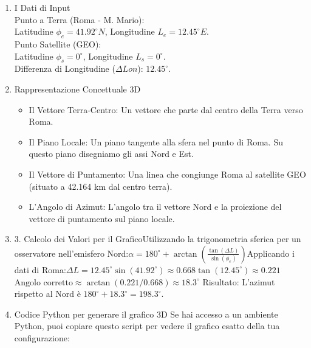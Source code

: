 \documentclass[a4paper,14pt]{article}
\begin{document}
\begin{enumerate}
\item I Dati di Input\\
Punto a Terra (Roma - M. Mario):\\
Latitudine \(\phi _{e}=41.92^{\circ }N\), Longitudine \(L_{e}=12.45^{\circ }E\).\\
Punto Satellite (GEO):\\
Latitudine \(\phi _{s}=0^{\circ }\), Longitudine \(L_{s}=0^{\circ }\).\\
Differenza di Longitudine (\(\Delta Lon\)): \(12.45^{\circ }\).\\
\item Rappresentazione Concettuale 3D\\
\begin{itemize}
\item Il Vettore Terra-Centro: Un vettore che parte dal centro della Terra verso Roma.
\item Il Piano Locale: Un piano tangente alla sfera nel punto di Roma. Su questo piano disegniamo gli assi Nord e Est.
\item Il Vettore di Puntamento: Una linea che congiunge Roma al satellite GEO (situato a 42.164 km dal centro terra).
\item L'Angolo di Azimut: L'angolo tra il vettore Nord e la proiezione del vettore di puntamento sul piano locale.
\end{itemize}
\item 3. Calcolo dei Valori per il GraficoUtilizzando la trigonometria sferica per un osservatore nell'emisfero Nord:\(\alpha =180^{\circ }+\arctan \left(\frac{\tan (\Delta L)}{\sin (\phi _{e})}\right)\)Applicando i dati di Roma:\(\Delta L=12.45^{\circ }\)\(\sin (41.92^{\circ })\approx 0.668\)\(\tan (12.45^{\circ })\approx 0.221\)\(\text{Angolo\ corretto}\approx \arctan (0.221/0.668)\approx 18.3^{\circ }\)
Risultato: L'azimut rispetto al Nord è \(180^{\circ }+18.3^{\circ }=198.3^{\circ }\).\\
\item Codice Python per generare il grafico 3D
Se hai accesso a un ambiente Python, puoi copiare questo script per vedere il grafico esatto della tua configurazione:
\end{enumerate}
\end{document}
